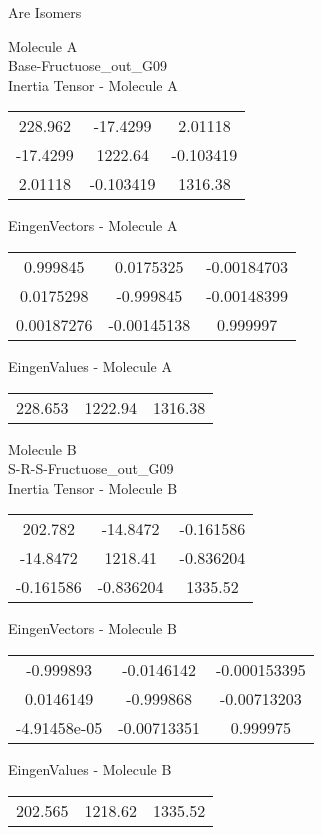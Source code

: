 \begin{center}
\vtab
\vtab
\textcolor{NavyBlue}{\Large Are Isomers}
\end{center}
\newpage
\begin{multicols}{2}
\begin{center}
Molecule A \\ 
Base-Fructuose\_out\_G09
\\
Inertia Tensor - Molecule A \\
\vtab
\begin{tabular}{|c c c|}
228.962	 & 	-17.4299	 & 	2.01118	 \\
-17.4299	 & 	1222.64	 & 	-0.103419	 \\
2.01118	 & 	-0.103419	 & 	1316.38
\end{tabular}

\vtab
 EingenVectors - Molecule A     \\
\vtab
\begin{tabular}{|c c c|}
0.999845	 & 	0.0175325	 & 	-0.00184703	 \\
0.0175298	 & 	-0.999845	 & 	-0.00148399	 \\
0.00187276	 & 	-0.00145138	 & 	0.999997
\end{tabular}

\vtab
 EingenValues - Molecule A     \\
\vtab
\begin{tabular}{|c c c|}
228.653	 & 	1222.94	 & 	1316.38
\end{tabular}
\columnbreak

Molecule B \\ 
S-R-S-Fructuose\_out\_G09
\\
Inertia Tensor - Molecule B \\
\vtab
\begin{tabular}{|c c c|}
202.782	 & 	-14.8472	 & 	-0.161586	 \\
-14.8472	 & 	1218.41	 & 	-0.836204	 \\
-0.161586	 & 	-0.836204	 & 	1335.52
\end{tabular}

\vtab
 EingenVectors - Molecule B     \\
\vtab
\begin{tabular}{|c c c|}
-0.999893	 & 	-0.0146142	 & 	-0.000153395	 \\
0.0146149	 & 	-0.999868	 & 	-0.00713203	 \\
-4.91458e-05	 & 	-0.00713351	 & 	0.999975
\end{tabular}

\vtab
 EingenValues - Molecule B     \\
\vtab
\begin{tabular}{|c c c|}
202.565	 & 	1218.62	 & 	1335.52
\end{tabular}

\end{center}
\end{multicols}
